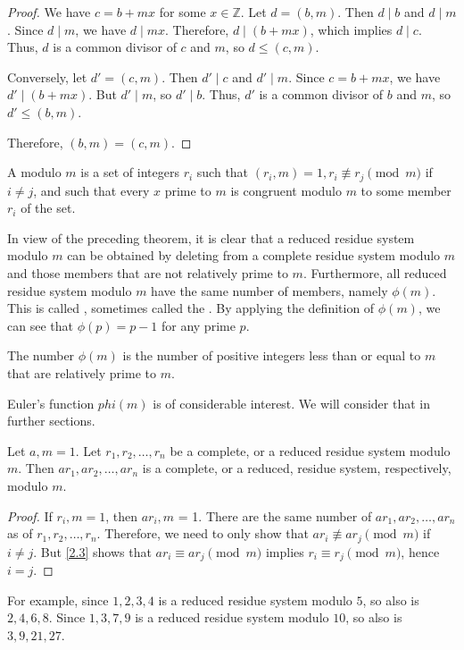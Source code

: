 \documentclass[11pt]{article}
\begin{document}
\begin{proof}
	We have \(c = b + mx\) for some \(x \in \mathbb{Z}\). Let \(d = (b, m)\). Then \(d \mid b\) and \(d \mid m\). Since \(d \mid m\), we have \(d \mid mx\). Therefore, \(d \mid (b + mx)\), which implies \(d \mid c\). Thus, \(d\) is a common divisor of \(c\) and \(m\), so \(d \leq (c, m)\).

	Conversely, let \(d' = (c, m)\). Then \(d' \mid c\) and \(d' \mid m\). Since
	\(c = b + mx\), we have \(d' \mid (b + mx)\). But \(d' \mid m\), so \(d' \mid
	b\). Thus, \(d'\) is a common divisor of \(b\) and \(m\), so \(d' \leq (b,
	m)\).

	Therefore, \((b, m) = (c, m)\).
\end{proof}

\begin{definition}
	A  modulo \(m\) is a set of integers \(r_i\) such that \((r_i, m) = 1, r_i \not\equiv r_j \pmod m\) if \(i \neq j\), and such that every \(x\) prime to \(m\) is congruent modulo \(m\) to some member \(r_i\) of the set.
\end{definition}

\begin{remark}
	In view of the preceding theorem, it is clear that a reduced residue system modulo \(m\) can be obtained by deleting from a complete residue system modulo \(m\) and those members that are not relatively prime to \(m\). Furthermore, all reduced residue system modulo \(m\) have the same number of members, namely \(\phi(m)\). This is called , sometimes called the . By applying the definition of \(\phi(m)\), we can see that \(\phi(p) = p - 1\) for any prime \(p\).
\end{remark}

\begin{theorem}\label{2.5}
	The number \(\phi (m)\) is the number of positive integers less than or equal to \(m\) that are relatively prime to \(m\).
\end{theorem}

Euler's function \(phi (m)\) is of considerable interest. We will consider that
in further sections.
\begin{theorem}\label{2.6}
	Let \(a, m = 1\). Let \(r_1, r_2, \ldots, r_n\) be a complete, or a reduced residue system modulo \(m\). Then \(ar_1, ar_2, \ldots, ar_n\) is a complete, or a reduced, residue system, respectively, modulo \(m\).
\end{theorem}
\begin{proof}
	If \(r_i, m = 1\), then \(ar_i, m\) = 1. There are the same number of \(ar_1, ar_2, \ldots, ar_n\) as of \(r_1, r_2, \ldots, r_n\). Therefore, we need to only show that \(ar_i \not \equiv ar_j \pmod{m}\) if \(i \neq j\). But \cref{2.3} shows that \(ar_i \equiv ar_j \pmod{m}\) implies \(r_i \equiv r_j \pmod{m}\), hence \(i = j\).
\end{proof}
\begin{example}
	For example, since \(1, 2, 3, 4\) is a reduced residue system modulo \(5\), so also is \(2, 4, 6, 8\). Since \(1, 3, 7, 9\) is a reduced residue system modulo \(10\), so also is \(3, 9, 21, 27\).
\end{example}
\end{document}

